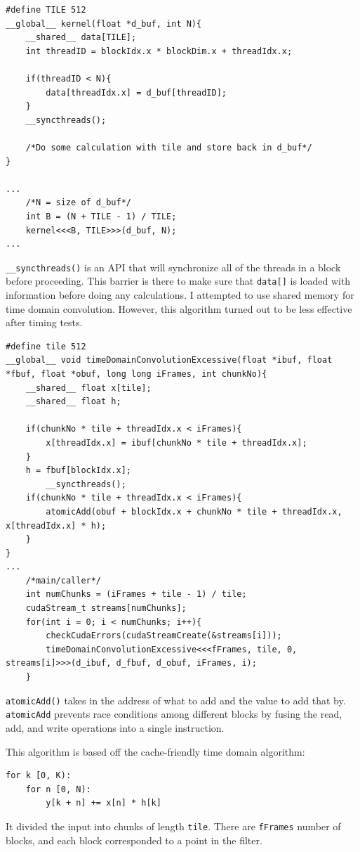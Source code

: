 \begin{verbatim}
#define TILE 512
__global__ kernel(float *d_buf, int N){
    __shared__ data[TILE];
    int threadID = blockIdx.x * blockDim.x + threadIdx.x;
    
    if(threadID < N){
        data[threadIdx.x] = d_buf[threadID];
    }
    __syncthreads();
    
    /*Do some calculation with tile and store back in d_buf*/
}

... 
    /*N = size of d_buf*/
    int B = (N + TILE - 1) / TILE;
    kernel<<<B, TILE>>>(d_buf, N);
...
\end{verbatim}

\verb|__syncthreads()| is an API that will synchronize all of the threads in a block before proceeding. This barrier is there to make sure that \verb|data[]| is loaded with information before doing any calculations. I attempted to use shared memory for time domain convolution. However, this algorithm turned out to be less effective after timing tests.

\begin{verbatim}
#define tile 512
__global__ void timeDomainConvolutionExcessive(float *ibuf, float *fbuf, float *obuf, long long iFrames, int chunkNo){
	__shared__ float x[tile];
	__shared__ float h;
	
	if(chunkNo * tile + threadIdx.x < iFrames){
		x[threadIdx.x] = ibuf[chunkNo * tile + threadIdx.x];
	}
	h = fbuf[blockIdx.x];
		__syncthreads();
	if(chunkNo * tile + threadIdx.x < iFrames){
		atomicAdd(obuf + blockIdx.x + chunkNo * tile + threadIdx.x, x[threadIdx.x] * h);
	}
}
...
    /*main/caller*/
    int numChunks = (iFrames + tile - 1) / tile;
    cudaStream_t streams[numChunks];
    for(int i = 0; i < numChunks; i++){
        checkCudaErrors(cudaStreamCreate(&streams[i]));
        timeDomainConvolutionExcessive<<<fFrames, tile, 0, streams[i]>>>(d_ibuf, d_fbuf, d_obuf, iFrames, i);
    }
\end{verbatim}

\verb|atomicAdd()| takes in the address of what to add and the value to add that by. \verb|atomicAdd| prevents race conditions among different blocks by fusing the read, add, and write operations into a single instruction.

This algorithm is based off the cache-friendly time domain algorithm:
\begin{verbatim}
for k [0, K):
    for n [0, N):
        y[k + n] += x[n] * h[k]
\end{verbatim}
It divided the input into chunks of length \verb|tile|. There are \verb|fFrames| number of blocks, and each block corresponded to a point in the filter. 

